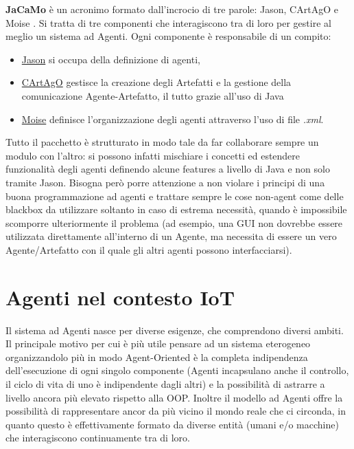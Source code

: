 \documentclass[12pt,a4paper,openright,oneside]{report}
\begin{document}
\textbf{JaCaMo} \cite{jacamo} è un acronimo formato dall'incrocio di tre parole: Jason, CArtAgO \cite{cartago} e Moise \cite{moise}. Si tratta di tre componenti che interagiscono tra di loro per gestire al meglio un sistema ad Agenti. Ogni componente è responsabile di un compito:

\begin{itemize}
	\item \ul{Jason} si occupa della definizione di agenti,
	\item \ul{CArtAgO} gestisce la creazione degli Artefatti e la gestione della comunicazione Agente-Artefatto, il tutto grazie all'uso di Java
	\item \ul{Moise} definisce l'organizzazione degli agenti attraverso l'uso di file \textit{.xml}.
\end{itemize}

Tutto il pacchetto è strutturato in modo tale da far collaborare sempre un modulo con l'altro: si possono infatti mischiare i concetti ed estendere funzionalità degli agenti definendo alcune features a livello di Java e non solo tramite Jason. Bisogna però porre attenzione a non violare i principi di una buona programmazione ad agenti e trattare sempre le cose non-agent come delle blackbox da utilizzare soltanto in caso di estrema necessità, quando è impossibile scomporre ulteriormente il problema (ad esempio, una GUI non dovrebbe essere utilizzata direttamente all'interno di un Agente, ma necessita di essere un vero Agente/Artefatto con il quale gli altri agenti possono interfacciarsi).

\section{Agenti nel contesto IoT}

Il sistema ad Agenti nasce per diverse esigenze, che comprendono diversi ambiti. Il principale motivo per cui è più utile pensare ad un sistema eterogeneo organizzandolo più in modo Agent-Oriented è la completa indipendenza dell'esecuzione di ogni singolo componente (Agenti incapsulano anche il controllo, il ciclo di vita di uno è indipendente dagli altri) e la possibilità di astrarre a livello ancora più elevato rispetto alla OOP. Inoltre il modello ad Agenti offre la possibilità di rappresentare ancor da più vicino il mondo reale che ci circonda, in quanto questo è effettivamente formato da diverse entità (umani e/o macchine) che interagiscono continuamente tra di loro.\\
\end{document}
